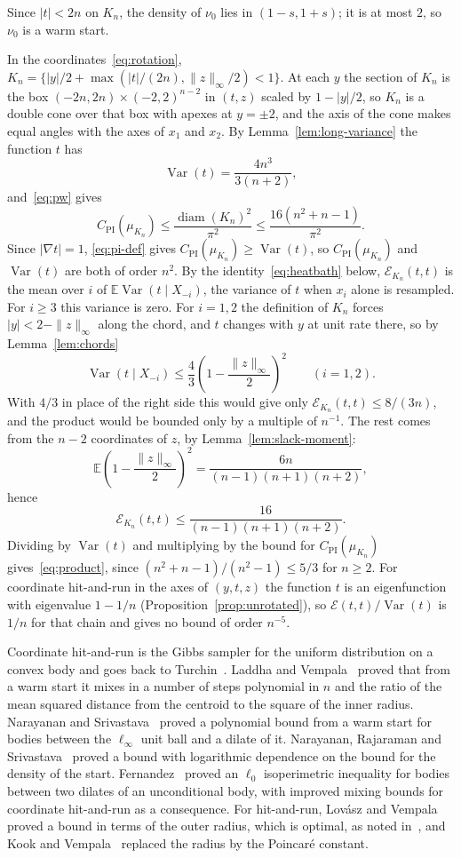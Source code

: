 \documentclass[11pt]{amsart}
\theoremstyle{remark}
\numberwithin{equation}{section}
\newcommand{\E}{\mathbb E}
\newcommand{\Var}{\operatorname{Var}}
\newcommand{\diam}{\operatorname{diam}}
\newcommand{\CPI}{C_{\mathrm{PI}}}
\begin{document}
Since $|t|<2n$ on $K_n$, the density of $\nu_0$ lies in $(1-s,1+s)$; it is at most $2$, so $\nu_0$ is a warm start.

In the coordinates~\eqref{eq:rotation},
$K_n=\{|y|/2+\max(|t|/(2n),\|z\|_\infty/2)<1\}$. At each $y$ the section of $K_n$ is the box $(-2n,2n)\times(-2,2)^{n-2}$ in $(t,z)$ scaled by $1-|y|/2$, so $K_n$ is a double cone over that box with apexes at $y=\pm2$, and the axis of the cone makes equal angles with the axes of $x_1$ and $x_2$. By Lemma~\ref{lem:long-variance} the function $t$ has
\[
 \Var(t)=\frac{4n^3}{3(n+2)},
\]
and~\eqref{eq:pw} gives
\[
 \CPI(\mu_{K_n})\le\frac{\diam(K_n)^2}{\pi^2}\le\frac{16(n^2+n-1)}{\pi^2}.
\] Since $|\nabla t|=1$, \eqref{eq:pi-def} gives
$\CPI(\mu_{K_n})\ge\Var(t)$, so $\CPI(\mu_{K_n})$ and $\Var(t)$ are both of
order $n^2$. By the identity~\eqref{eq:heatbath} below, $\mathcal E_{K_n}(t,t)$ is the
mean over $i$ of $\E\Var(t\mid X_{-i})$, the variance of $t$ when $x_i$
alone is resampled. For $i\ge3$ this variance is zero. For $i=1,2$ the
definition of $K_n$ forces $|y|<2-\|z\|_\infty$ along the chord, and $t$
changes with $y$ at unit rate there, so by Lemma~\ref{lem:chords}
\[
 \Var(t\mid X_{-i})\le\frac43\left(1-\frac{\|z\|_\infty}{2}\right)^2
 \qquad(i=1,2).
\]
With $4/3$ in place of the right side this would give only
$\mathcal E_{K_n}(t,t)\le8/(3n)$, and the product would be bounded only by a multiple
of $n^{-1}$. The rest comes from the $n-2$ coordinates of $z$, by Lemma~\ref{lem:slack-moment}:
\[
 \E\left(1-\frac{\|z\|_\infty}{2}\right)^2=\frac{6n}{(n-1)(n+1)(n+2)},
\]
hence
\[
 \mathcal E_{K_n}(t,t)\le\frac{16}{(n-1)(n+1)(n+2)}.
\]
Dividing by $\Var(t)$ and multiplying by the bound for $\CPI(\mu_{K_n})$ gives~\eqref{eq:product}, since $(n^2+n-1)/(n^2-1)\le5/3$ for $n\ge2$. For coordinate hit-and-run in the axes of
$(y,t,z)$ the function $t$ is an eigenfunction with eigenvalue $1-1/n$
(Proposition~\ref{prop:unrotated}), so $\mathcal E(t,t)/\Var(t)$ is $1/n$ for that
chain and gives no bound of order $n^{-5}$.

Coordinate hit-and-run is the Gibbs sampler for the uniform distribution
on a convex body and goes back to Turchin~\cite{Turchin}. Laddha and
Vempala~\cite{LV20} proved that from a warm start it mixes in a number of steps polynomial in
$n$ and the ratio of the mean squared distance from the centroid to the
square of the inner radius. Narayanan
and Srivastava~\cite{NS20} proved a polynomial bound from a warm start for
bodies between the $\ell_\infty$ unit ball and a dilate of it. Narayanan,
Rajaraman and Srivastava~\cite{NRS} proved a bound with logarithmic
dependence on the bound for the density of the start. Fernandez~\cite{Fernandez} proved an
$\ell_0$ isoperimetric inequality for bodies between two dilates of an
unconditional body, with improved mixing bounds for coordinate hit-and-run
as a consequence. For hit-and-run, Lov\'asz and Vempala~\cite{LV06} proved
a bound in terms of the outer radius, which is optimal, as noted
in~\cite[Section~1]{KV}, and Kook and Vempala~\cite{KV} replaced the
radius by the Poincar\'e constant.
\end{document}
